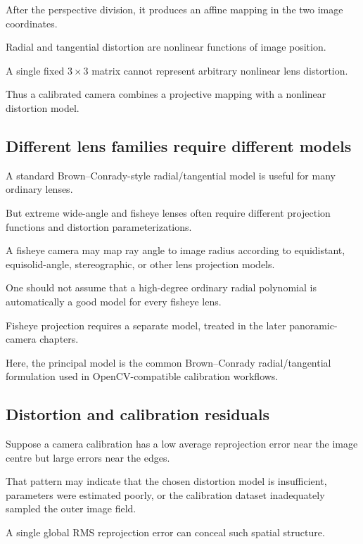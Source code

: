 After the perspective division, it produces an affine mapping in the two image coordinates.

Radial and tangential distortion are nonlinear functions of image position.

A single fixed \(3\times3\) matrix cannot represent arbitrary nonlinear lens distortion.

Thus a calibrated camera combines a projective mapping with a nonlinear distortion model.

\subsection{Different lens families require different models}\label{02-foundations-ii-ch035-different-lens-families-require-different-models}

A standard Brown--Conrady-style radial/tangential model is useful for many ordinary lenses.

But extreme wide-angle and fisheye lenses often require different projection functions and distortion parameterizations.

A fisheye camera may map ray angle to image radius according to equidistant, equisolid-angle, stereographic, or other lens projection models.

One should not assume that a high-degree ordinary radial polynomial is automatically a good model for every fisheye lens.

Fisheye projection requires a separate model, treated in the later panoramic-camera chapters.

Here, the principal model is the common Brown--Conrady radial/tangential formulation used in OpenCV-compatible calibration workflows. 

\subsection{Distortion and calibration residuals}\label{02-foundations-ii-ch035-distortion-and-calibration-residuals}

Suppose a camera calibration has a low average reprojection error near the image centre but large errors near the edges.

That pattern may indicate that the chosen distortion model is insufficient, parameters were estimated poorly, or the calibration dataset inadequately sampled the outer image field.

A single global RMS reprojection error can conceal such spatial structure.

